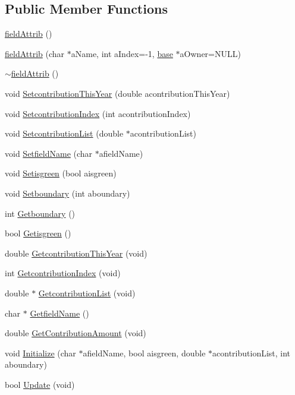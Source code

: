\subsection*{Public Member Functions}
\begin{DoxyCompactItemize}
\item 
\hyperlink{classfield_attrib_aa749f89cc6d6dbe3fac906600bfc3aac}{fieldAttrib} ()
\item 
\hyperlink{classfield_attrib_a53985e7c789cb2e0ef6688115d6ffd21}{fieldAttrib} (char $\ast$aName, int aIndex=-\/1, \hyperlink{classbase}{base} $\ast$aOwner=NULL)
\item 
\hyperlink{classfield_attrib_a1f87a4e6d877167b1638b5975612da96}{$\sim$fieldAttrib} ()
\item 
void \hyperlink{classfield_attrib_abd3790fd21092aa352faa41a5d055954}{SetcontributionThisYear} (double acontributionThisYear)
\item 
void \hyperlink{classfield_attrib_a45ae6386d6b50b150c4f362780f697d8}{SetcontributionIndex} (int acontributionIndex)
\item 
void \hyperlink{classfield_attrib_ae5184861296fd63af3c2b1a9403537d8}{SetcontributionList} (double $\ast$acontributionList)
\item 
void \hyperlink{classfield_attrib_a9926dbe834aa92abb307e7e749fcba26}{SetfieldName} (char $\ast$afieldName)
\item 
void \hyperlink{classfield_attrib_a491620797034f67d1765c289ef707524}{Setisgreen} (bool aisgreen)
\item 
void \hyperlink{classfield_attrib_a2e9eb533967cb731f5617795916beece}{Setboundary} (int aboundary)
\item 
int \hyperlink{classfield_attrib_af6bdce2faa2b4bd3659fbc767062a750}{Getboundary} ()
\item 
bool \hyperlink{classfield_attrib_a3de94bc37fc2f61ec3b759c6948f5db3}{Getisgreen} ()
\item 
double \hyperlink{classfield_attrib_a42dd5454a9138b86b2eadbbc8ebbda67}{GetcontributionThisYear} (void)
\item 
int \hyperlink{classfield_attrib_ae2bd2af2884f9efe7054bd22054d9419}{GetcontributionIndex} (void)
\item 
double $\ast$ \hyperlink{classfield_attrib_afab6e6148d727d1ce35e1368c3cb08c3}{GetcontributionList} (void)
\item 
char $\ast$ \hyperlink{classfield_attrib_a395c4971a644d511ae28591c5d3ccabc}{GetfieldName} ()
\item 
double \hyperlink{classfield_attrib_abbf1653e171389eee4236612443e63b6}{GetContributionAmount} (void)
\item 
void \hyperlink{classfield_attrib_a7932fac29193dc92b2890dfe7c14b317}{Initialize} (char $\ast$afieldName, bool aisgreen, double $\ast$acontributionList, int aboundary)
\item 
bool \hyperlink{classfield_attrib_ab2d84237175869c877781230f9768897}{Update} (void)
\end{DoxyCompactItemize}
